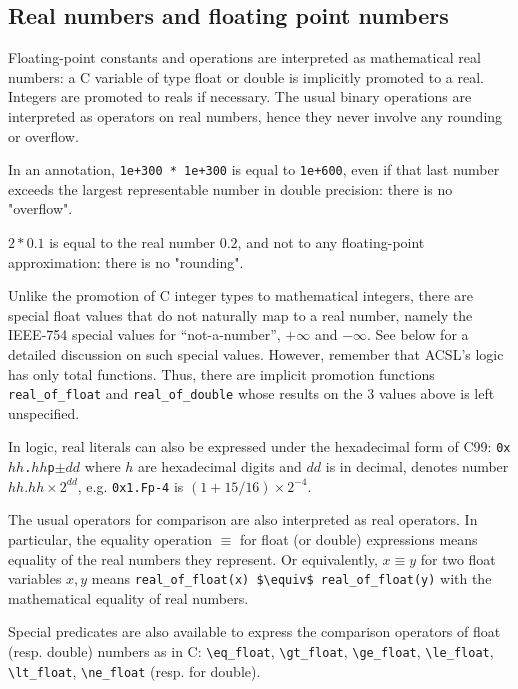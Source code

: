\subsection{Real numbers and floating point numbers}
\label{sec:floating-point}

Floating-point constants and operations are interpreted as
mathematical real numbers: a C variable of type float or double is
implicitly promoted to a real. Integers are promoted to reals if
necessary. The usual binary operations are interpreted as operators on
real numbers, hence they never involve any rounding or overflow.

\begin{example}
  In an annotation, \lstinline|1e+300 * 1e+300| is equal to
  \lstinline|1e+600|, even if that last number exceeds the largest
  representable number in double precision: there is no "overflow".

  $2 * 0.1$ is equal to the real number $0.2$, and not to any 
  floating-point approximation: there is no "rounding".
\end{example}
Unlike the promotion of C integer types to mathematical integers,
there are special float values that do not naturally map to a real
number, namely the IEEE-754 special values for ``not-a-number'',
$+\infty$ and $-\infty$. See below for a detailed discussion on such
special values. However, remember that ACSL's logic has only total
functions. Thus, there are implicit promotion functions
\lstinline|real_of_float| and
\lstinline|real_of_double| whose results on
the 3 values above is left unspecified.

In logic, real literals can also be expressed under the hexadecimal
form of C99: \texttt{0x$hh$.$hh$p$\pm{}dd$} where $h$ are hexadecimal
digits and $dd$ is in decimal, denotes number $hh.hh\times
2^{dd}$, e.g. \texttt{0x1.Fp-4} is $(1+15/16)\times 2^{-4}$.


The usual operators for comparison are also interpreted as real operators. 
In particular, the equality operation $\equiv$ for float (or double)
expressions means equality of the real numbers they represent. Or equivalently, $x \equiv y$ for two float
variables $x,y$ means \lstinline|real_of_float(x) $\equiv$ real_of_float(y)|
with the mathematical equality of real
numbers.


Special predicates are also available to express the comparison
operators of float (resp. double) numbers as in C:
\lstinline|\eq_float|,
\lstinline|\gt_float|,
\lstinline|\ge_float|,
\lstinline|\le_float|,
\lstinline|\lt_float|,
\lstinline|\ne_float|
(resp. for double).



